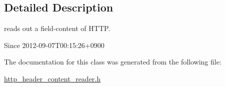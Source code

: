 \subsection{Detailed Description}
reads out a field-\/content of H\-T\-T\-P. 

\begin{DoxySince}{Since}
2012-\/09-\/07\-T00\-:15\-:26+0900 
\end{DoxySince}


The documentation for this class was generated from the following file\-:\begin{DoxyCompactItemize}
\item 
\hyperlink{http__header__content__reader_8h}{http\-\_\-header\-\_\-content\-\_\-reader.\-h}\end{DoxyCompactItemize}
